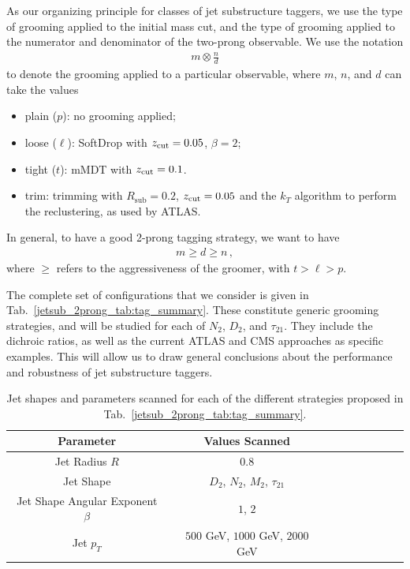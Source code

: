 \documentclass[11pt]{cernrep}
\begin{document}
As our organizing principle for classes of  jet substructure taggers, we use the type of grooming applied to the initial mass cut, and the type of grooming applied to the numerator and denominator of the two-prong observable.
%
We use the notation 
\begin{align}
m \otimes \frac{n}{d}
\end{align}
%
to denote the grooming applied to a particular observable, where $m$, $n$, and $d$ can take the values
%
\begin{itemize}
\item plain ($p$): no grooming applied;
\item loose ($\ell$): SoftDrop with ${z_{\rm cut}}=0.05$, $\beta=2$;
\item tight ($t$): mMDT with ${z_{\rm cut}}=0.1$.
\item trim: trimming with $R_{\text{sub}}=0.2$,  $ {z_{\rm cut}}=0.05$ and the $k_T$ algorithm to perform the reclustering, as used by ATLAS.
\end{itemize}
%
In general, to have a good 2-prong tagging strategy, we want to have
\begin{align}
m \geq d \geq n\,,
\end{align}
%
where $\geq$ refers to the aggressiveness of the groomer, with $t > \ell > p$.

The complete set of configurations that we consider is given in Tab.~\ref{jetsub_2prong_tab:tag_summary}.
%
These constitute generic grooming strategies, and will be studied for each of $N_2$, $D_2$, and $\tau_{21}$.
%
They include the dichroic ratios, as well as the current ATLAS and CMS approaches as specific examples.
%
This will allow us to draw general conclusions about the performance and robustness of jet substructure taggers.


\begin{table}
\begin{center}
\begin{tabular}{| c | c | c |c |c|c|c |c|r| }
  \hline                       
  Parameter &  Values Scanned \\
  \hline
  Jet Radius $R$ &   $0.8$ \\
  Jet Shape  &   $D_2$, $N_2$, $M_2$, $\tau_{21}$  \\
  Jet Shape Angular Exponent $\beta$ &   $1$, $2$ \\
  Jet $p_T$ &   $500$ GeV, $1000$ GeV, $2000$ GeV  \\
  \hline  
\end{tabular}
\end{center}
\caption{
Jet shapes and parameters scanned for each of the different strategies proposed in Tab.~\ref{jetsub_2prong_tab:tag_summary}. 
}
\label{jetsub_2prong_tab:params}
\end{table}
\end{document}
